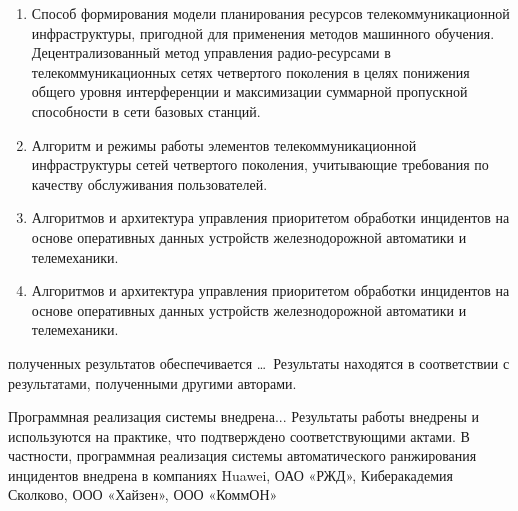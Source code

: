 {}
\begin{enumerate}
  \item Способ формирования модели планирования ресурсов телекоммуникационной инфраструктуры, пригодной для применения методов машинного обучения. Децентрализованный метод управления радио-ресурсами в телекоммуникационных сетях четвертого поколения в целях понижения общего уровня интерференции и максимизации суммарной пропускной способности в сети базовых станций.
  \item Алгоритм и режимы работы элементов телекоммуникационной инфраструктуры сетей четвертого поколения, учитывающие требования по  качеству обслуживания пользователей.
  \item Алгоритмов и архитектура управления приоритетом обработки инцидентов на основе оперативных данных устройств железнодорожной автоматики и телемеханики.
  \item Алгоритмов и архитектура управления приоритетом обработки инцидентов на основе оперативных данных устройств железнодорожной автоматики и телемеханики.
\end{enumerate}

{\reliability} полученных результатов обеспечивается \ldots \ Результаты находятся в соответствии с результатами, полученными другими авторами.



Программная реализация системы  внедрена... 
Результаты работы внедрены и используются на практике, что подтверждено соответствующими актами. В частности, программная реализация системы автоматического ранжирования инцидентов внедрена в компаниях Huawei, ОАО «РЖД», Киберакадемия Сколково, ООО «Хайзен», ООО «КоммОН» 

